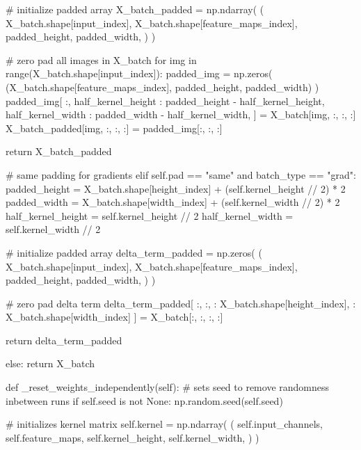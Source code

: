 \documentclass[%
oneside,                 %
final,                   %
10pt]{article}
\begin{document}
            # initialize padded array
            X_batch_padded = np.ndarray(
                (
                    X_batch.shape[input_index],
                    X_batch.shape[feature_maps_index],
                    padded_height,
                    padded_width,
                )
            )

            # zero pad all images in X_batch
            for img in range(X_batch.shape[input_index]):
                padded_img = np.zeros(
                    (X_batch.shape[feature_maps_index], padded_height, padded_width)
                )
                padded_img[
                    :,
                    half_kernel_height : padded_height - half_kernel_height,
                    half_kernel_width : padded_width - half_kernel_width,
                ] = X_batch[img, :, :, :]
                X_batch_padded[img, :, :, :] = padded_img[:, :, :]

            return X_batch_padded

        # same padding for gradients
        elif self.pad == "same" and batch_type == "grad":
            padded_height = X_batch.shape[height_index] + (self.kernel_height // 2) * 2
            padded_width = X_batch.shape[width_index] + (self.kernel_width // 2) * 2
            half_kernel_height = self.kernel_height // 2
            half_kernel_width = self.kernel_width // 2

            # initialize padded array
            delta_term_padded = np.zeros(
                (
                    X_batch.shape[input_index],
                    X_batch.shape[feature_maps_index],
                    padded_height,
                    padded_width,
                )
            )

            # zero pad delta term
            delta_term_padded[
                :, :, : X_batch.shape[height_index], : X_batch.shape[width_index]
            ] = X_batch[:, :, :, :]

            return delta_term_padded

        else:
            return X_batch

    def _reset_weights_independently(self):
        # sets seed to remove randomness inbetween runs
        if self.seed is not None:
            np.random.seed(self.seed)

        # initializes kernel matrix
        self.kernel = np.ndarray(
            (
                self.input_channels,
                self.feature_maps,
                self.kernel_height,
                self.kernel_width,
            )
        )
\end{document}
